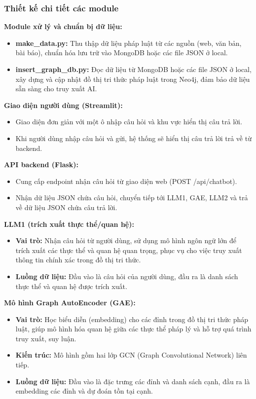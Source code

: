 \documentclass[a4paper]{article}
\begin{document}
\subsubsection{Thiết kế chi tiết các module}
\textbf{Module xử lý và chuẩn bị dữ liệu:} 
\begin{itemize}
    \item \textbf{make\_data.py:} Thu thập dữ liệu pháp luật từ các nguồn (web, văn bản, bài báo), chuẩn hóa lưu trữ vào MongoDB hoặc các file JSON ở local.
    \item \textbf{insert\_graph\_db.py:} Đọc dữ liệu từ MongoDB hoặc các file JSON ở local, xây dựng và cập nhật đồ thị tri thức pháp luật trong Neo4j, đảm bảo dữ liệu sẵn sàng cho truy xuất AI.
\end{itemize}
\textbf{Giao diện người dùng (Streamlit):}
\begin{itemize}
    \item Giao diện đơn giản với một ô nhập câu hỏi và khu vực hiển thị câu trả lời.
    \item Khi người dùng nhập câu hỏi và gửi, hệ thống sẽ hiển thị câu trả lời trả về từ backend.
\end{itemize}
\textbf{API backend (Flask):}
\begin{itemize}
    \item Cung cấp endpoint nhận câu hỏi từ giao diện web (POST /api/chatbot).
    \item Nhận dữ liệu JSON chứa câu hỏi, chuyển tiếp tới LLM1, GAE, LLM2 và trả về dữ liệu JSON chứa câu trả lời.
\end{itemize}
\textbf{LLM1 (trích xuất thực thể/quan hệ):}
\begin{itemize}
    \item \textbf{Vai trò:} Nhận câu hỏi từ người dùng, sử dụng mô hình ngôn ngữ lớn để trích xuất các thực thể và quan hệ quan trọng, phục vụ cho việc truy xuất thông tin chính xác trong đồ thị tri thức.
    \item \textbf{Luồng dữ liệu:} Đầu vào là câu hỏi của người dùng, đầu ra là danh sách thực thể và quan hệ được trích xuất.
\end{itemize}
\textbf{Mô hình Graph AutoEncoder (GAE):}
\begin{itemize}
    \item \textbf{Vai trò:} Học biểu diễn (embedding) cho các đỉnh trong đồ thị tri thức pháp luật, giúp mô hình hóa quan hệ giữa các thực thể pháp lý và hỗ trợ quá trình truy xuất, suy luận.
    \item \textbf{Kiến trúc:} Mô hình gồm hai lớp GCN (Graph Convolutional Network) liên tiếp.
    \item \textbf{Luồng dữ liệu:} Đầu vào là đặc trưng các đỉnh và danh sách cạnh, đầu ra là embedding các đỉnh và dự đoán tồn tại cạnh.
\end{itemize}
\end{document}
